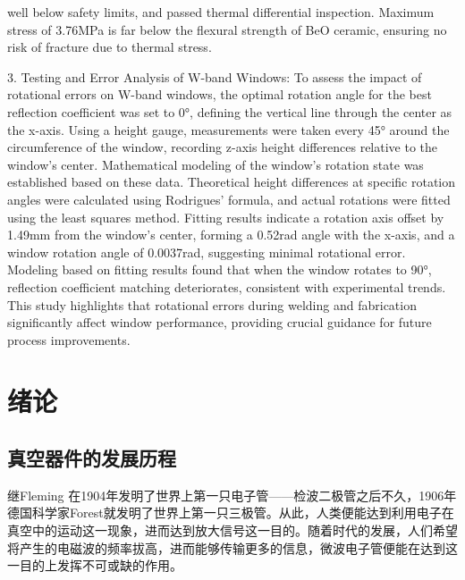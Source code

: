 \documentclass[master]{thesis-uestc}
\begin{document}
\begin{englishabstract}
    well below safety limits, and passed thermal differential inspection. Maximum stress of 3.76MPa is far below the flexural strength of BeO ceramic, ensuring no risk of fracture due to thermal stress.

    3. Testing and Error Analysis of W-band Windows: To assess the impact of rotational errors on W-band windows, the optimal rotation angle for the best reflection coefficient was set to 0°, defining the vertical line through the center as the x-axis. Using a height gauge, measurements were taken every 45° around the circumference of the window, recording z-axis height differences relative to the window's center. Mathematical modeling of the window's rotation state was established based on these data. Theoretical height differences at specific rotation angles were calculated using Rodrigues' formula, and actual rotations were fitted using the least squares method. Fitting results indicate a rotation axis offset by 1.49mm from the window's center, forming a 0.52rad angle with the x-axis, and a window rotation angle of 0.0037rad, suggesting minimal rotational error. Modeling based on fitting results found that when the window rotates to 90°, reflection coefficient matching deteriorates, consistent with experimental trends. This study highlights that rotational errors during welding and fabrication significantly affect window performance, providing crucial guidance for future process improvements.

\end{englishabstract}

\thesistableofcontents %



\chapter{绪\hspace{6pt}论}
\section{真空器件的发展历程}
继Fleming 在1904年发明了世界上第一只电子管——检波二极管之后不久，1906年德国科学家Forest就发明了世界上第一只三极管。从此，人类便能达到利用电子在真空中的运动这一现象，进而达到放大信号这一目的。随着时代的发展，人们希望将产生的电磁波的频率拔高，进而能够传输更多的信息，微波电子管便能在达到这一目的上发挥不可或缺的作用。
\end{document}
